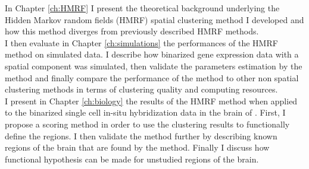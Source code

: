 	In Chapter \ref{ch:HMRF} I  present the theoretical background underlying the Hidden Markov random fields (HMRF) spatial clustering method I developed and how this method diverges from previously described HMRF methods. \\
	
	I then evaluate in Chapter \ref{ch:simulations} the performances of the HMRF method on simulated data. I describe how binarized gene expression data with a spatial component was simulated, then validate the parameters estimation by the method and finally compare the performance of the method to other non spatial clustering methods in terms of clustering quality and computing resources.\\
	
	I present in Chapter \ref{ch:biology} the results of the HMRF method when applied to the binarized single cell in-situ hybridization data in the brain of \platyfull{}. First, I propose a scoring method in order to use the clustering results to functionally define the regions. I then validate the method further by describing known regions of the brain that are found by the method. Finally I discuss how functional hypothesis can be made for unstudied regions of the brain.
	
	
	

%
%
%
%
%



